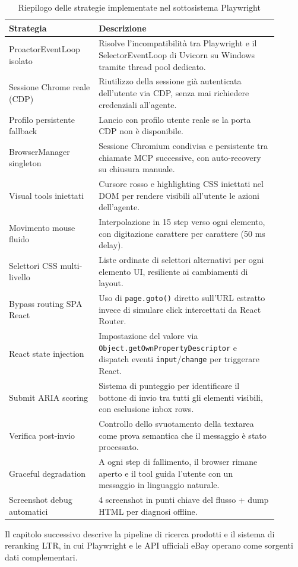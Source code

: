 \begin{table}[htbp]
\centering
\caption{Riepilogo delle strategie implementate nel sottosistema Playwright}
\label{tab:pw-strategies}
\begin{tabular}{p{0.30\linewidth}p{0.60\linewidth}}
\hline
\textbf{Strategia} & \textbf{Descrizione} \\
\hline
ProactorEventLoop isolato & Risolve l'incompatibilità tra Playwright e il SelectorEventLoop di Uvicorn su Windows tramite thread pool dedicato. \\
Sessione Chrome reale (CDP) & Riutilizzo della sessione già autenticata dell'utente via CDP, senza mai richiedere credenziali all'agente. \\
Profilo persistente fallback & Lancio con profilo utente reale se la porta CDP non è disponibile. \\
BrowserManager singleton & Sessione Chromium condivisa e persistente tra chiamate MCP successive, con auto-recovery su chiusura manuale. \\
Visual tools iniettati & Cursore rosso e highlighting CSS iniettati nel DOM per rendere visibili all'utente le azioni dell'agente. \\
Movimento mouse fluido & Interpolazione in 15 step verso ogni elemento, con digitazione carattere per carattere (50 ms delay). \\
Selettori CSS multi-livello & Liste ordinate di selettori alternativi per ogni elemento UI, resiliente ai cambiamenti di layout. \\
Bypass routing SPA React & Uso di \texttt{page.goto()} diretto sull'URL estratto invece di simulare click intercettati da React Router. \\
React state injection & Impostazione del valore via \texttt{Object.getOwnPropertyDescriptor} e dispatch eventi \texttt{input}/\texttt{change} per triggerare React. \\
Submit ARIA scoring & Sistema di punteggio per identificare il bottone di invio tra tutti gli elementi visibili, con esclusione inbox rows. \\
Verifica post-invio & Controllo dello svuotamento della textarea come prova semantica che il messaggio è stato processato. \\
Graceful degradation & A ogni step di fallimento, il browser rimane aperto e il tool guida l'utente con un messaggio in linguaggio naturale. \\
Screenshot debug automatici & 4 screenshot in punti chiave del flusso + dump HTML per diagnosi offline. \\
\hline
\end{tabular}
\end{table}

Il capitolo successivo descrive la pipeline di ricerca prodotti e il
sistema di reranking LTR, in cui Playwright e le API ufficiali eBay
operano come sorgenti dati complementari.

